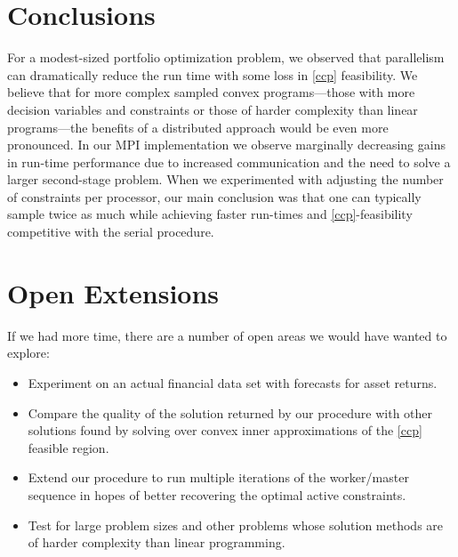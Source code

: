 \documentclass[12pt]{article}
\begin{document}
\section*{Conclusions}
For a modest-sized portfolio optimization problem, we observed that parallelism can dramatically reduce the run time with some loss in \ref{ccp} feasibility.
We believe that for more complex sampled convex programs---those with more decision variables and constraints or those of harder complexity than linear programs---the benefits of a distributed approach would be even more pronounced.
In our MPI implementation we observe marginally decreasing gains in run-time performance due to increased communication and the need to solve a larger second-stage problem.
When we experimented with adjusting the number of constraints per processor, our main conclusion was that one can typically sample twice as much while achieving faster run-times and \ref{ccp}-feasibility competitive with the serial procedure.


\section*{Open Extensions}
If we had more time, there are a number of open areas we would have wanted to explore:
\begin{itemize}
\item Experiment on an actual financial data set with forecasts for asset returns.
\item Compare the quality of the solution returned by our procedure with other solutions found by solving over convex inner approximations of the \ref{ccp} feasible region.
\item Extend our procedure to run multiple iterations of the worker/master sequence in hopes of better recovering the optimal active constraints.
\item Test for large problem sizes and other problems whose solution methods are of harder complexity than linear programming.
\end{itemize}
\end{document}
